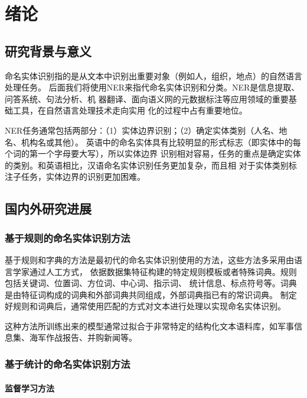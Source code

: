 
\chapter{绪论}


\section{研究背景与意义}

命名实体识别指的是从文本中识别出重要对象（例如人，组织，地点）的自然语言处理任务\parencite{erdogan2010sequence}。
后面我们将使用NER来指代命名实体识别和分类。NER是信息提取、问答系统、句法分析、机
器翻译、面向语义网的元数据标注等应用领域的重要基础工具，在自然语言处理技术走向实用
化的过程中占有重要地位。

NER任务通常包括两部分：（1）实体边界识别；（2）确定实体类别（人名、地名、机构名或其他）。
英语中的命名实体具有比较明显的形式标志（即实体中的每个词的第一个字母要大写），所以实体边界
识别相对容易，任务的重点是确定实体的类别。和英语相比，汉语命名实体识别任务更加复杂，而且相
对于实体类别标注子任务，实体边界的识别更加困难。


\section{国内外研究进展}


\subsection{基于规则的命名实体识别方法}

基于规则和字典的方法是最初代的命名实体识别使用的方法，这些方法多采用由语言学家通过人工方式，
依据数据集特征构建的特定规则模板或者特殊词典。规则包括关键词、位置词、方位词、中心词、指示词、
统计信息、标点符号等。词典是由特征词构成的词典和外部词典共同组成，外部词典指已有的常识词典。
制定好规则和词典后，通常使用匹配的方式对文本进行处理以实现命名实体识别。

这种方法所训练出来的模型通常过拟合于非常特定的结构化文本语料库，如军事信息集、海军作战报告、并购新闻等。


\subsection{基于统计的命名实体识别方法}

\subsubsection{监督学习方法}

